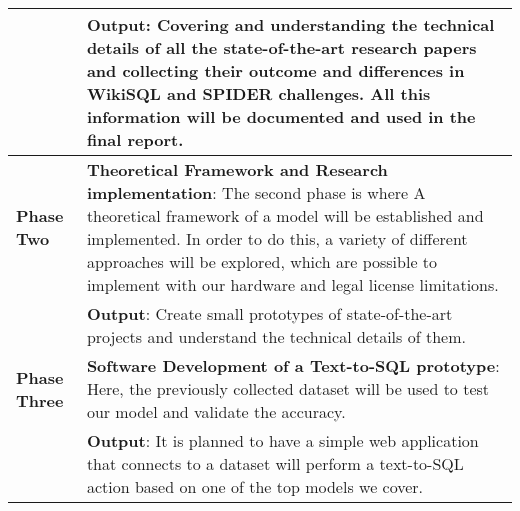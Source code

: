 \begin{tabular}{|l|p{12cm}|}
                         & \textbf{Output}: Covering and understanding the technical details of all the state-of-the-art research papers and collecting their outcome and differences in WikiSQL and SPIDER challenges.  All this information will be documented and used in the final report.                                                                                                                                                                                                     \\
    \hline
    \textbf{Phase Two}   & \textbf{Theoretical Framework and Research implementation}: The second phase is where A theoretical framework of a model will be established and implemented. In order to do this, a variety of different approaches will be explored, which are possible to implement with our hardware and legal license limitations.                                                                                                                                                 \\
                         & \textbf{Output}: Create small prototypes of state-of-the-art projects and understand the technical details of them.                                                                                                                                                                                                                                                                                                                                                     \\
    \hline
    \textbf{Phase Three} & \textbf{Software Development of a Text-to-SQL prototype}: Here, the previously collected dataset will be used to test our model and validate the accuracy.                                                                                                                                                                                                                                                                                                              \\
                         & \textbf{Output}: It is planned to have a simple web application that connects to a dataset will perform a text-to-SQL action based on one of the top models we cover.                                                                                                                                                                                                                                                                                                   \\

\end{tabular}
